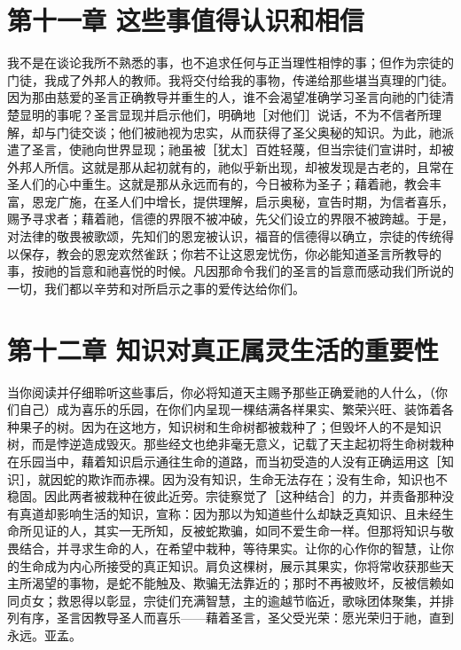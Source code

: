 
\section{第十一章  这些事值得认识和相信}

我不是在谈论我所不熟悉的事，也不追求任何与正当理性相悖的事；但作为宗徒的门徒，我成了外邦人的教师。我将交付给我的事物，传递给那些堪当真理的门徒。因为那由慈爱的圣言正确教导并重生的人，谁不会渴望准确学习圣言向祂的门徒清楚显明的事呢？圣言显现并启示他们，明确地［对他们］说话，不为不信者所理解，却与门徒交谈；他们被祂视为忠实，从而获得了圣父奥秘的知识。为此，祂派遣了圣言，使祂向世界显现；祂虽被［犹太］百姓轻蔑，但当宗徒们宣讲时，却被外邦人所信。这就是那从起初就有的，祂似乎新出现，却被发现是古老的，且常在圣人们的心中重生。这就是那从永远而有的，今日被称为圣子；藉着祂，教会丰富，恩宠广施，在圣人们中增长，提供理解，启示奥秘，宣告时期，为信者喜乐，赐予寻求者；藉着祂，信德的界限不被冲破，先父们设立的界限不被跨越。于是，对法律的敬畏被歌颂，先知们的恩宠被认识，福音的信德得以确立，宗徒的传统得以保存，教会的恩宠欢然雀跃；你若不让这恩宠忧伤，你必能知道圣言所教导的事，按祂的旨意和祂喜悦的时候。凡因那命令我们的圣言的旨意而感动我们所说的一切，我们都以辛劳和对所启示之事的爱传达给你们。\par


\section{第十二章 知识对真正属灵生活的重要性}

当你阅读并仔细聆听这些事后，你必将知道天主赐予那些正确爱祂的人什么，（你们自己）成为喜乐的乐园，在你们内呈现一棵结满各样果实、繁荣兴旺、装饰着各种果子的树。因为在这地方，知识树和生命树都被栽种了；但毁坏人的不是知识树，而是悖逆造成毁灭。那些经文也绝非毫无意义，记载了天主起初将生命树栽种在乐园当中，藉着知识启示通往生命的道路，而当初受造的人没有正确运用这［知识］，就因蛇的欺诈而赤裸。因为没有知识，生命无法存在；没有生命，知识也不稳固。因此两者被栽种在彼此近旁。宗徒察觉了［这种结合］的力，并责备那种没有真道却影响生活的知识，宣称：因为那以为知道些什么却缺乏真知识、且未经生命所见证的人，其实一无所知，反被蛇欺骗，如同不爱生命一样。但那将知识与敬畏结合，并寻求生命的人，在希望中栽种，等待果实。让你的心作你的智慧，让你的生命成为内心所接受的真正知识。肩负这棵树，展示其果实，你将常收获那些天主所渴望的事物，是蛇不能触及、欺骗无法靠近的；那时不再被败坏，反被信赖如同贞女；救恩得以彰显，宗徒们充满智慧，主的逾越节临近，歌咏团体聚集，并排列有序，圣言因教导圣人而喜乐——藉着圣言，圣父受光荣：愿光荣归于祂，直到永远。亚孟。\par

